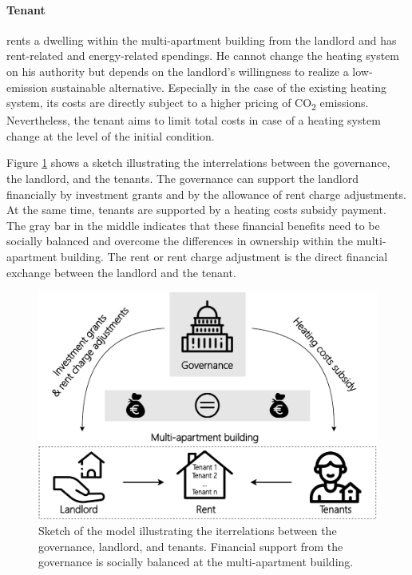 \paragraph{Tenant} rents a dwelling within the multi-apartment building from the landlord and has rent-related and energy-related spendings. He cannot change the heating system on his authority but depends on the landlord's willingness to realize a low-emission sustainable alternative. Especially in the case of the existing heating system, its costs are directly subject to a higher pricing of CO\textsubscript{2} emissions. Nevertheless, the tenant aims to limit total costs in case of a heating system change at the level of the initial condition.\vspace{0.5cm}

Figure \ref{fig:methodology} shows a sketch illustrating the interrelations between the governance, the landlord, and the tenants. The governance can support the landlord financially by investment grants and by the allowance of rent charge adjustments. At the same time, tenants are supported by a heating costs subsidy payment. The gray bar in the middle indicates that these financial benefits need to be socially balanced and overcome the differences in ownership within the multi-apartment building. The rent or rent charge adjustment is the direct financial exchange between the landlord and the tenant.\vspace{0.5cm}

\begin{figure}[h]
	\centering
	\includegraphics[width=1\linewidth]{figures/3_Methodology/Sketch.pdf}
	\caption{Sketch of the model illustrating the iterrelations between the governance, landlord, and tenants. Financial support from the governance is socially balanced at the multi-apartment building.}
	\label{fig:methodology}
\end{figure}

